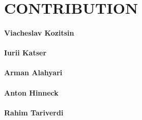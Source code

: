 \section{CONTRIBUTION}
\label{CONTRIBUTION}

\paragraph{Viacheslav Kozitsin}

\paragraph{Iurii Katser}
	
\paragraph{Arman Alahyari}
	
\paragraph{Anton Hinneck}
	
\paragraph{Rahim Tariverdi}